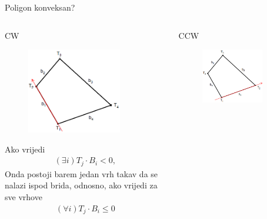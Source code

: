 \documentclass[9pt]{beamer}
\begin{document}
\begin{frame}{Poligon konveksan?}
	\begin{columns}
		\begin{column}[t]{0.5\textwidth}
			CW
			\begin{figure}
				\centering
				\includegraphics[width=0.8\textwidth]{slike/poligon_cw.png}
			\end{figure}
			Ako vrijedi 
			\begin{align*}
			(\exists i) T_j \cdot B_i < 0 ,
			\end{align*}
			Onda postoji barem jedan vrh takav da se nalazi ispod brida, odnosno, ako vrijedi za sve vrhove
			\begin{align*}
			(\forall i) T_j \cdot B_i \leq 0 
			\end{align*}
		\end{column}
		\begin{column}[t]{0.5\textwidth}
			CCW
			\begin{figure}
				\centering		
				\includegraphics[width=0.8\textwidth]{slike/poligon_ccw.png}

\end{figure}
\end{column}
\end{columns}
\end{frame}
\end{document}
